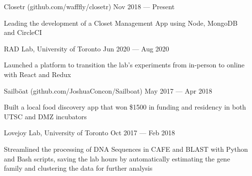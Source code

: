 \begin{cventries}
  \cventry
    {}
    {Closetr (github.com/wafffly/closetr)}
    {}
    {Nov 2018 --- Present}
    {}
    {
      \begin{cvitems}
        \item {Leading the development of a Closet Management App using Node, MongoDB and CircleCI}
      \end{cvitems}
    }
  \cventry
    {}
    {RAD Lab, University of Toronto}
    {}
    {Jun 2020 --- Aug 2020}
    {}
    {
      \begin{cvitems}
        \item {Launched a platform to transition the lab's experiments from in-person to online with React and Redux}
      \end{cvitems}
    }
  \cventry
    {}
    {Sailböat (github.com/JoshuaConcon/Sailboat)}
    {}
    {May 2017 --- Apr 2018}
    {}
    {
      \begin{cvitems}
        \item {Built a local food discovery app that won \$1500 in funding and residency in both UTSC and DMZ incubators}
      \end{cvitems}
    }
  \cventry
    {}
    {Lovejoy Lab, University of Toronto}
    {}
    {Oct 2017 --- Feb 2018}
    {}
    {
      \begin{cvitems}
        \item {Streamlined the processing of DNA Sequences in CAFE and BLAST with Python and Bash scripts, saving the lab hours by automatically estimating the gene family and clustering the data for further analysis}
      \end{cvitems}
    }
\end{cventries}